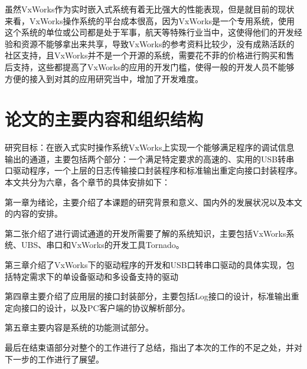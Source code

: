 	虽然VxWorks作为实时嵌入式系统有着无比强大的性能表现，但是就目前的现状来看，VxWorks操作系统的平台成本很高，因为VxWorks是一个专用系统，使用这个系统的单位或公司都是处于军事，航天等特殊行业当中，这使得他们的开发经验和资源不能够拿出来共享，导致VxWorks的参考资料比较少，没有成熟活跃的社区支持，且VxWorks并不是一个开源的系统，需要花不菲的价格进行购买和售后支持，这些都提高了VxWorks的应用的开发门槛，使得一般的开发人员不能够方便的接入到对其的应用研究当中，增加了开发难度。

\section{论文的主要内容和组织结构}	
	研究目标：在嵌入式实时操作系统VxWorks上实现一个能够满足程序的调试信息输出的通道，主要包括两个部分：一个满足特定要求的高速的、实用的USB转串口驱动程序，一个上层的日志传输接口封装程序和标准输出重定向接口封装程序。\\
 本文共分为六章，各个章节的具体安排如下：
 
 第一章为绪论，主要介绍了本课题的研究背景和意义、国内外的发展状况以及本文的内容的安排。
 
 第二张介绍了进行调试通道的开发所需要了解的系统知识，主要包括VxWorks系统、UBS、串口和VxWorks的开发工具Tornado。
 
 第三章介绍了VxWorks下的驱动程序的开发和USB口转串口驱动的具体实现，包括特定需求下的单设备驱动和多设备支持的驱动
 
 第四章主要介绍了应用层的接口封装部分，主要包括Log接口的设计，标准输出重定向接口的设计，以及PC客户端的协议解析部分。
 
 第五章主要内容是系统的功能测试部分。
 
 最后在结束语部分对整个的工作进行了总结，指出了本次的工作的不足之处，并对下一步的工作进行了展望。 

